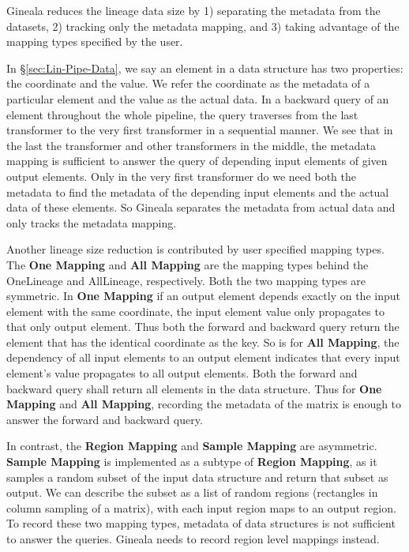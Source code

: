\documentclass{sig-alternate}
\begin{document}
Gineala reduces the lineage data size by 1) separating the metadata from the datasets, 2) tracking only the metadata mapping, 
and 3) taking advantage of the mapping types specified by the user.

In \S\ref{sec:Lin-Pipe-Data}, we say an element in a data structure has two properties: the coordinate and the value.
We refer the coordinate as the metadata of a particular element and the value as the actual data. 
In a backward query of an element throughout the whole pipeline, the query traverses from the last transformer
to the very first transformer in a sequential manner. 
We see that in the last the transformer and other transformers in the middle, the metadata mapping is sufficient to answer
the query of depending input elements of given output elements. Only in the very first transformer do we need both the metadata
to find the metadata of the depending input elements and the actual data of these elements.
So Gineala separates the metadata from actual data and only tracks the metadata mapping.

Another lineage size reduction is contributed by user specified mapping types. 
The {\bf One Mapping} and {\bf All Mapping} are the mapping types behind the OneLineage and AllLineage, respectively.
Both the two mapping types are symmetric.
In {\bf One Mapping} if an output element depends exactly on the input element with the same coordinate, 
the input element value only propagates to that only output element. 
Thus both the forward and backward query return the element that has the identical coordinate as the key.
So is for {\bf All Mapping}, the dependency of all input elements to an output element indicates that every input element's value propagates to all output elements.
Both the forward and backward query shall return all elements in the data structure.
Thus for {\bf One Mapping} and {\bf All Mapping}, recording the metadata of the matrix is enough to answer the forward and backward query.

In contrast, the {\bf Region Mapping} and {\bf Sample Mapping} are asymmetric. 
{\bf Sample Mapping} is implemented as a subtype of {\bf Region Mapping}, as it samples a random subset of the input data structure and return that subset as output.
We can describe the subset as a list of random regions (rectangles in column sampling of a matrix), with each input region maps to an output region.
To record these two mapping types, metadata of data structures is not sufficient to answer the queries. 
Gineala needs to record region level mappings instead.
\end{document}
